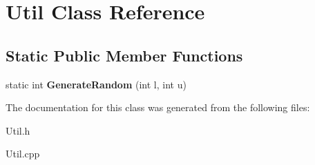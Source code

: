 \hypertarget{class_util}{}\section{Util Class Reference}
\label{class_util}
\subsection*{Static Public Member Functions}
\begin{DoxyCompactItemize}
\item 
\hypertarget{class_util_af9e2112ba400436dd749539bdeffea5b}{}static int {\bfseries Generate\+Random} (int l, int u)\label{class_util_af9e2112ba400436dd749539bdeffea5b}

\end{DoxyCompactItemize}


The documentation for this class was generated from the following files\+:\begin{DoxyCompactItemize}
\item 
Util.\+h\item 
Util.\+cpp\end{DoxyCompactItemize}

